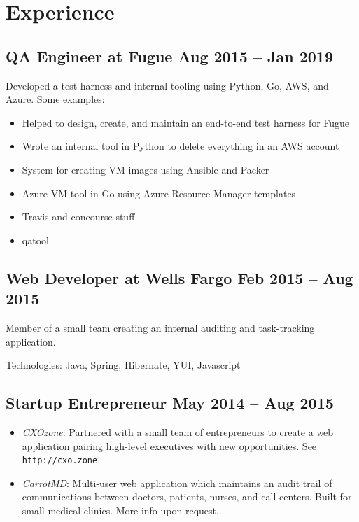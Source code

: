 \documentclass[12pt]{article}
\begin{document}

\section*{Experience}

\subsection*{QA Engineer at Fugue \hfill Aug 2015 -- Jan 2019}

Developed a test harness and internal tooling using Python, Go, AWS, and Azure.
Some examples:

\begin{itemize}
\item Helped to design, create, and maintain an end-to-end test harness for
  Fugue
\item Wrote an internal tool in Python to delete everything in an AWS account
\item System for creating VM images using Ansible and Packer
\item Azure VM tool in Go using Azure Resource Manager templates
\item Travis and concourse stuff
\item qatool
\end{itemize}

\subsection*{Web Developer at Wells Fargo \hfill Feb 2015 -- Aug 2015}

Member of a small team creating an internal auditing and task-tracking
application.

Technologies: Java, Spring, Hibernate, YUI, Javascript

\subsection*{Startup Entrepreneur \hfill May 2014 -- Aug 2015}

\begin{itemize}
  \item \textit{CXOzone}: Partnered with a small team of entrepreneurs to create
    a web application pairing high-level executives with new opportunities. See
    \texttt{http://cxo.zone}.

  \item \textit{CarrotMD}: Multi-user web application which maintains an audit
    trail of communications between doctors, patients, nurses, and call centers.
    Built for small medical clinics. More info upon request.
\end{itemize}
\end{document}
